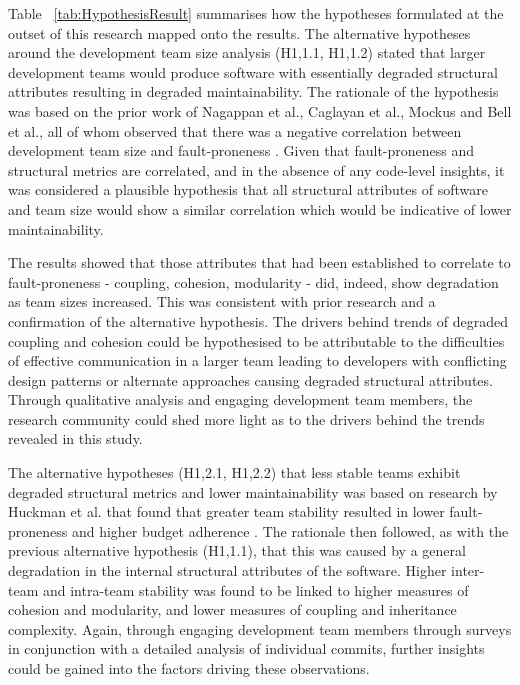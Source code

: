 Table ~\ref{tab:HypothesisResult} summarises how the hypotheses formulated at the outset of this research mapped onto the results. The alternative hypotheses around the development team size analysis (H1,1.1, H1,1.2) stated that larger development teams would produce software with essentially degraded structural attributes resulting in degraded maintainability. The rationale of the hypothesis was based on the prior work of Nagappan et al., Caglayan et al., Mockus and Bell et al., all of whom observed that there was a negative correlation between development team size and fault-proneness \citep{nagappan2008influence, mockus2010organizational, bell2013limited, caglayan2015merits}. Given that fault-proneness and structural metrics are correlated, and in the absence of any code-level insights, it was considered a plausible hypothesis that all structural attributes of software and team size would show a similar correlation which would be indicative of lower maintainability. 

The results showed that those attributes that had been established to correlate to fault-proneness - coupling, cohesion, modularity - did, indeed, show degradation as team sizes increased. This was consistent with prior research and a confirmation of the alternative hypothesis. The drivers behind trends of degraded coupling and cohesion could be hypothesised to be attributable to the difficulties of effective communication in a larger team leading to developers with conflicting design patterns or alternate approaches causing degraded structural attributes. Through qualitative analysis and engaging development team members, the research community could shed more light as to the drivers behind the trends revealed in this study.

The alternative hypotheses (H1,2.1, H1,2.2) that less stable teams exhibit degraded structural metrics and lower maintainability was based on research by Huckman et al. that found that greater team stability resulted in lower fault-proneness and higher budget adherence \citep{huckman2009team}. The rationale then followed, as with the previous alternative hypothesis (H1,1.1), that this was caused by a general degradation in the internal structural attributes of the software. Higher inter-team and intra-team stability was found to be linked to higher measures of cohesion and modularity, and lower measures of coupling and inheritance complexity. Again, through engaging development team members through surveys in conjunction with a detailed analysis of individual commits, further insights could be gained into the factors driving these observations.

